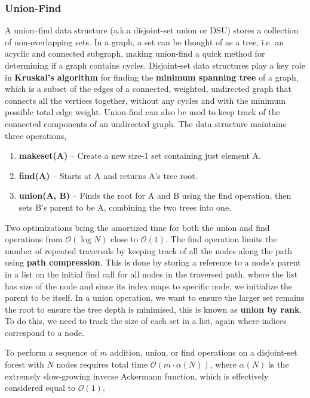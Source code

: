 \documentclass{article}
\newcommand{\bigO}{\mathcal{O}}
\begin{document}
\subsubsection{Union-Find}
A union–find data structure (a.k.a disjoint-set union  or DSU) stores a collection of non-overlapping sets. In a graph, a set can be thought of as a tree, i.e. an acyclic and connected subgraph, making union-find a quick method for determining if a graph contains cycles. Disjoint-set data structures play a key role in \textbf{Kruskal's algorithm} for finding the \textbf{minimum spanning tree} of a graph, which is a subset of the edges of a connected, weighted, undirected graph that connects all the vertices together, without any cycles and with the minimum possible total edge weight. Union-find can also be used to keep track of the connected components of an undirected graph. The data structure maintains three operations,
\begin{enumerate}
    \item \textbf{makeset(A)} -- Create a new size-1 set containing just element A.
    \item \textbf{find(A)} -- Starts at A and returns A's tree root.
    \item \textbf{union(A, B) } --  Finds the root for A and B using the find operation, then sets B's parent to be A, combining the two trees into one.
\end{enumerate}

Two optimizations bring the amortized time for both the union and find operations from $\bigO(\log N)$ close to $\bigO(1)$. The find operation limits the number of repeated traversals by keeping track of all the nodes along the path using \textbf{path compression}. This is done by storing a reference to a node's parent in a list on the initial find call for all nodes in the traversed path, where the list has size of the node and since its index maps to specific node, we initialize the parent to be itself. In a union operation, we want to ensure the larger set  remains the root to ensure the tree depth is minimised, this is known as \textbf{union by rank}. To do this, we need to track the size of each set in a list, again where indices correspond to a node. 

To perform a sequence of $m$ addition, union, or find operations on a disjoint-set forest with $N$ nodes requires total time $\bigO(m \cdot \alpha(N))$, where $\alpha(N)$ is the extremely slow-growing inverse Ackermann function, which is effectively considered equal to $\bigO(1)$.
\end{document}
